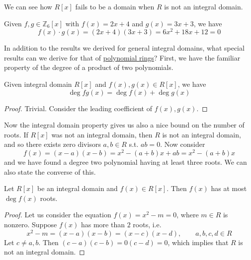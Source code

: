   We can see how $R[x]$ fails to be a domain when $R$ is not an integral domain. 

  \begin{example}
    \label{ex:product-of-two-linear-polynomials-is-0}
    Given $f, g \in \mathbb{Z}_6 [x]$ with $f(x) = 2x + 4$ and $g(x) = 3x + 3$, we have 
    \begin{equation}
      f(x) \cdot g(x) = (2x + 4)(3x + 3) = 6x^2 + 18 x + 12 = 0
    \end{equation}
  \end{example}

  In addition to the results we derived for general integral domains, what special results can we derive for that of \hyperref[def:polynomial-ring]{polynomial rings}? First, we have the familiar property of the degree of a product of two polynomials. 

  \begin{lemma}
    \label{thm:degree-of-product-of-polynomials}
    Given integral domain $R[x]$ and $f(x), g(x) \in R[x]$, we have 
    \begin{equation}
      \deg{fg(x)} = \deg{f(x)} + \deg{g(x)}
    \end{equation}
  \end{lemma}
  \begin{proof}
    Trivial. Consider the leading coefficient of $f(x), g(x)$. 
  \end{proof}

  Now the integral domain property gives us also a nice bound on the number of roots. If $R[x]$ was not an integral domain, then $R$ is not an integral domain, and so there exists zero divisors $a, b \in R$ s.t. $ab = 0$. Now consider 
  \begin{equation}
    f(x) = (x - a) (x - b) = x^2 - (a + b) x + ab = x^2 - (a + b) x
  \end{equation}
  and we have found a degree two polynomial having at least three roots. We can also state the converse of this. 

  \begin{theorem}
    \label{thm:bounds-on-number-of-roots}
    Let $R[x]$ be an integral domain and $f(x) \in R[x]$. Then $f(x)$ has at most $\deg{f(x)}$ roots. 
  \end{theorem}
  \begin{proof}
    Let us consider the equation $f(x) = x^2 - m = 0$, where $m \in R$ is nonzero. Suppose $f(x)$ has more than $2$ roots, i.e. 
    \begin{equation}
      x^2 - m = (x - a)(x - b) = (x - c) (x - d), \qquad a, b, c, d \in R
    \end{equation}
    Let $c \neq a, b$. Then $(c - a)(c - b) = 0 (c - d) = 0$, which implies that $R$ is not an integral domain. 
  \end{proof}

